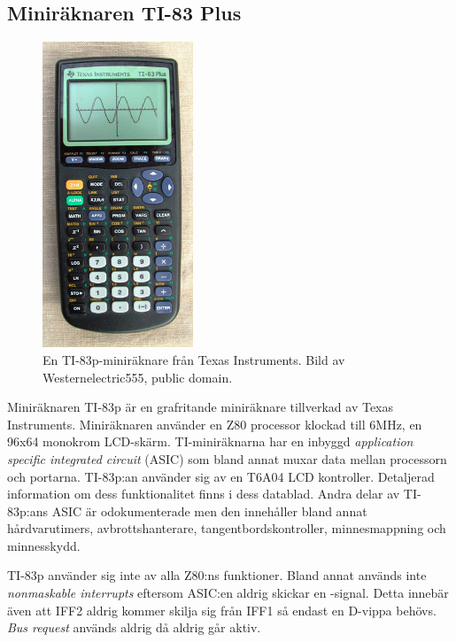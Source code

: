 \documentclass[main.tex]{subfiles}
\begin{document}
\newpage
\subsection{Miniräknaren TI-83 Plus}

\begin{figure}
    \centering
    \includegraphics[width=0.4\textwidth, bb=0 0 284 578]{img/ti83p.jpg}
    \caption{En TI-83p-miniräknare från Texas Instruments. Bild av
    Westernelectric555, public domain.}
    \label{fig:ti83p}
\end{figure}

Miniräknaren TI-83p är en grafritande miniräknare tillverkad av Texas
Instruments. Miniräknaren använder en Z80 processor klockad till 6MHz, en 96x64
monokrom LCD-skärm. TI-miniräknarna har en inbyggd {\it application specific
integrated circuit} (ASIC) som bland annat muxar data mellan processorn och
portarna. TI-83p:an använder sig av en T6A04 LCD kontroller. Detaljerad
information om dess funktionalitet finns i dess datablad\cite{t6a04}. Andra
delar av TI-83p:ans ASIC är odokumenterade men den innehåller bland annat
hårdvarutimers, avbrottshanterare, tangentbordskontroller, minnesmappning och
minnesskydd.

TI-83p använder sig inte av alla Z80:ns funktioner. Bland annat används inte
{\it nonmaskable interrupts} eftersom ASIC:en aldrig skickar en
-signal. Detta innebär även att IFF2 aldrig kommer skilja sig från
IFF1 så endast en D-vippa behövs. {\it Bus request} används aldrig då
 aldrig går aktiv.
\end{document}

